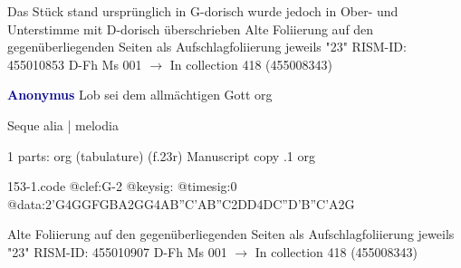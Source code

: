 \documentclass[twocolumn]{book}
\begin{document}
\newline Das Stück stand ursprünglich in G-dorisch wurde jedoch in Ober- und Unterstimme mit D-dorisch überschrieben
\newline Alte Foliierung auf den gegenüberliegenden Seiten als Aufschlagfoliierung jeweils "23"
\newline RISM-ID: 455010853
\newline D-Fh  Ms 001
\newline $\rightarrow$ In collection 418 (455008343)
      
\newline \par \vspace{7pt} \textcolor{darkblue}{\textbf{Anonymus  }}
\newline Lob sei dem allmächtigen Gott
\newline org
\newline \begin{itshape}[f.23r, at right:] Seque alia | melodia\end{itshape} 
\newline \textcolor{darkblue}{}  1 parts: org (tabulature)  (f.23r)
\newline Manuscript copy
.1  org  
\begin{filecontents*}{153-1.code}
@clef:G-2
@keysig:
@timesig:0
@data:2'G4GGFGBA2GG4AB''C'AB''C2DD4DC''D'B''C'A2G
\end{filecontents*}
\newline
%

\newline Alte Foliierung auf den gegenüberliegenden Seiten als Aufschlagfoliierung jeweils "23"
\newline RISM-ID: 455010907
\newline D-Fh  Ms 001
\newline $\rightarrow$ In collection 418 (455008343)
      
\end{document}
